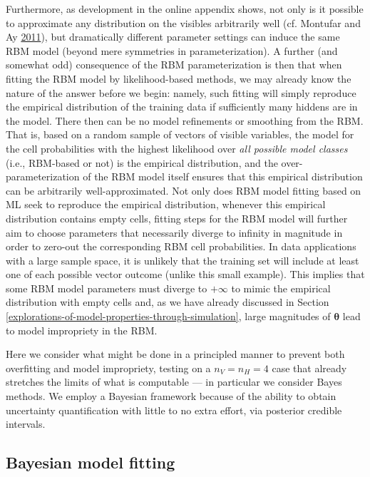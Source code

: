 \documentclass[]{article}
\theoremstyle{definition}
\newcommand{\nv}{{n_{\scriptscriptstyle V}}}
\newcommand{\nh}{{n_{\scriptscriptstyle H}}}
\begin{document}
Furthermore, as development in the online appendix shows, not only is it
possible to approximate any distribution on the visibles arbitrarily
well (cf. Montufar and Ay
\protect\hyperlink{ref-montufar2011refinements}{2011}), but dramatically
different parameter settings can induce the same RBM model (beyond mere
symmetries in parameterization). A further (and somewhat odd)
consequence of the RBM parameterization is then that when fitting the
RBM model by likelihood-based methods, we may already know the nature of
the answer before we begin: namely, such fitting will simply reproduce
the empirical distribution of the training data if sufficiently many
hiddens are in the model. There then can be no model refinements or
smoothing from the RBM. That is, based on a random sample of vectors of
visible variables, the model for the cell probabilities with the highest
likelihood over \emph{all possible model classes} (i.e., RBM-based or
not) is the empirical distribution, and the over-parameterization of the
RBM model itself ensures that this empirical distribution can be
arbitrarily well-approximated. Not only does RBM model fitting based on
ML seek to reproduce the empirical distribution, whenever this empirical
distribution contains empty cells, fitting steps for the RBM model will
further aim to choose parameters that necessarily diverge to infinity in
magnitude in order to zero-out the corresponding RBM cell probabilities.
In data applications with a large sample space, it is unlikely that the
training set will include at least one of each possible vector outcome
(unlike this small example). This implies that some RBM model parameters
must diverge to \(+\infty\) to mimic the empirical distribution with
empty cells and, as we have already discussed in Section
\ref{explorations-of-model-properties-through-simulation}, large
magnitudes of \(\boldsymbol \theta\) lead to model impropriety in the
RBM.

Here we consider what might be done in a principled manner to prevent
both overfitting and model impropriety, testing on a \(\nv = \nh = 4\)
case that already stretches the limits of what is computable --- in
particular we consider Bayes methods. We employ a Bayesian framework
because of the ability to obtain uncertainty quantification with little
to no extra effort, via posterior credible intervals.

\hypertarget{bayesian-model-fitting}{%
\subsection{Bayesian model fitting}\label{bayesian-model-fitting}}
\end{document}
